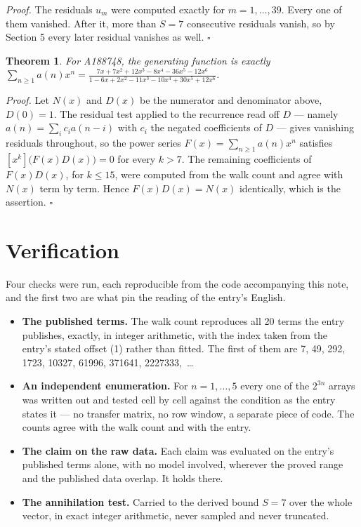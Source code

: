 \documentclass[11pt]{article}
\newtheorem{theorem}{Theorem}
\theoremstyle{definition}
\begin{document}
{\itshape Proof.} The residuals $u_m$ were computed exactly for $m = 1,\dots,39$. Every one of them vanished. After it, more than $S = 7$ consecutive residuals vanish, so by Section 5 every later residual vanishes as well. $\square$

\begin{theorem} For A188748, the generating function is exactly $\sum_{n\ge 1} a(n)x^n = \frac{7x + 7x^{2} + 12x^{3} - 8x^{4} - 36x^{5} - 12x^{6}}{1 - 6x + 2x^{2} - 11x^{3} - 10x^{4} + 30x^{5} + 12x^{6}}$.\end{theorem}

{\itshape Proof.} Let $N(x)$ and $D(x)$ be the numerator and denominator above, $D(0)=1$. The residual test applied to the recurrence read off $D$ --- namely $a(n) = \sum_i c_i a(n-i)$ with $c_i$ the negated coefficients of $D$ --- gives vanishing residuals throughout, so the power series $F(x)=\sum_{n\ge 1}a(n)x^n$ satisfies $[x^k]\bigl(F(x)D(x)\bigr) = 0$ for every $k > 7$. The remaining coefficients of $F(x)D(x)$, for $k \le 15$, were computed from the walk count and agree with $N(x)$ term by term. Hence $F(x)D(x) = N(x)$ identically, which is the assertion. $\square$

\section{Verification}

Four checks were run, each reproducible from the code accompanying this note, and the first two are what pin the reading of the entry's English.

\begin{itemize}

\item {\bfseries The published terms.} The walk count reproduces all 20 terms the entry publishes, exactly, in integer arithmetic, with the index taken from the entry's stated offset (1) rather than fitted. The first of them are 7, 49, 292, 1723, 10327, 61996, 371641, 2227333,~\dots

\item {\bfseries An independent enumeration.} For $n = 1,\dots,5$ every one of the $2^{3n}$ arrays was written out and tested cell by cell against the condition as the entry states it --- no transfer matrix, no row window, a separate piece of code. The counts agree with the walk count and with the entry.

\item {\bfseries The claim on the raw data.} Each claim was evaluated on the entry's published terms alone, with no model involved, wherever the proved range and the published data overlap. It holds there.

\item {\bfseries The annihilation test.} Carried to the derived bound $S = 7$ over the whole vector, in exact integer arithmetic, never sampled and never truncated.

\end{itemize}
\end{document}
